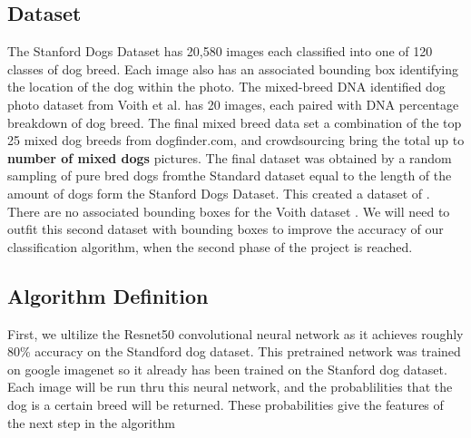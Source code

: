 \documentclass[12pt]{article}
\begin{document}
\subsection{Dataset}

The Stanford Dogs Dataset has 20,580 images each classified into one of 120 classes of dog breed. \cite{khosla2011novel} Each image also has an associated bounding box identifying the location of the dog within the photo. The mixed-breed DNA identified dog photo dataset from Voith et al. \cite{voith2009comparison} has 20 images, each paired with DNA percentage breakdown of dog breed. The final mixed breed data set a combination of the top 25 mixed dog breeds from dogfinder.com, and crowdsourcing bring the total up to \textbf{number of mixed dogs} pictures.  The final dataset was obtained by a random sampling of pure bred dogs fromthe Standard dataset equal to the length of the amount of dogs form the Stanford Dogs Dataset.  This created a dataset of . There are no associated bounding boxes for the Voith dataset \cite{voith2009comparison}. We will need to outfit this second dataset with bounding boxes to improve the accuracy of our classification algorithm, when the second phase of the project is reached. 

\subsection{Algorithm Definition}

First, we ultilize the Resnet50 convolutional neural network as it achieves roughly 80\% accuracy on the Standford dog dataset.  This pretrained network was trained on google imagenet so it already has been trained on the Stanford dog dataset.  Each image will be run thru this neural network, and the probablilities that the dog is a certain breed will be returned.  These probabilities give the features of the next step in the algorithm
\end{document}

